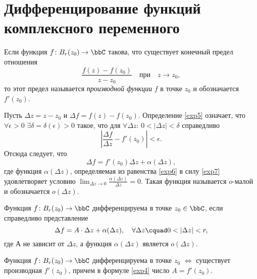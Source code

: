 \section{Дифференцирование функций комплексного переменного}
\begin{defn}
\label{exp5}
Если функция  $f\colon B_r(z_0) \to \bbC $ такова, что существует конечный предел отношения
$$
\frac{f(z)-f(z_0)}{z-z_0} \quad\text{при}\quad z \to z_0,
$$
то этот предел называется \textit{производной функции} $f$ в точке $z_0$ и обозначается $f'(z_0)$. 
\end{defn}
Пусть $\Delta z = z - z_0$ и $\Delta f = f(z) - f(z_0)$. Определение \ref{exp5} означает, что $\forall \epsilon > 0$ $\exists \delta=\delta(\epsilon)>0$ такое, что для $\forall \Delta z$: $0 <|\Delta z| <\delta$ справедливо 
\begin{equation}
\label{exp7}
\left|\frac{\Delta f}{\Delta z} - f'(z_0) \right| < \epsilon.
\end{equation}
Отсюда следует, что 
\begin{equation}
\label{exp6}
\Delta f = f'(z_0)\Delta z + \alpha(\Delta z),
\end{equation}
где функция $\alpha(\Delta z)$, определяемая из равенства \eqref{exp6} в силу \eqref{exp7} удовлетворяет условию $\lim_{\Delta z \to 0}\limits \frac{\alpha(\Delta z)}{\Delta z} = 0$. Такая функция называется $o$-малой и обозначается $o(\Delta z)$.

\begin{defn}
Функция $f\colon B_r(z_0) \to \bbC $ дифференцируема в точке $z_0 \in \bbC$, если справедливо представление 
\begin{equation}
\label{exp4}
\Delta f = A\cdot \Delta z + \alpha(\Delta z),\quad \forall \Delta z\cquad 0 < |\Delta z|< r,
\end{equation}
где А не зависит от $\Delta z$, а функция $\alpha(\Delta z)$ является $o(\Delta z)$.
\end{defn}

\begin{lemm}
Функция $f\colon B_r(z_0) \to \bbC $ дифференцируема в точке $z_0$ $\Longleftrightarrow$ существует производная $f'(z_0)$, причем в формуле \eqref{exp4} число $A=f'(z_0)$.
\end{lemm}

